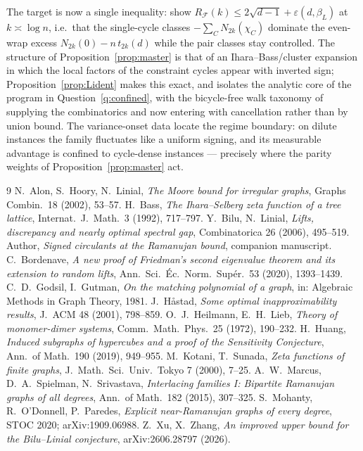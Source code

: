 \documentclass[11pt]{article}
\theoremstyle{remark}
\begin{document}
The target is now a single inequality: show
$R_{\mathcal F}(k)\le2\sqrt{d-1}+\varepsilon(d,\beta_L)$ at
$k\asymp\log n$, i.e.\ that the single-cycle classes
$-\sum_{C}N_{2k}(\chi_C)$ dominate the even-wrap excess
$N_{2k}(0)-n\,t_{2k}(d)$ while the pair classes stay controlled. The
structure of Proposition~\ref{prop:master} is that of an
Ihara--Bass/cluster expansion in which the local factors of the
constraint cycles appear with inverted sign; Proposition~\ref{prop:Lident}
makes this exact, and isolates the analytic core of the program in
Question~\ref{q:confined}, with the bicycle-free walk taxonomy of
\cite{mop20} supplying the combinatorics
and now entering with cancellation rather than by union bound. The variance-onset data locate the regime boundary: on dilute
instances the family fluctuates like a uniform signing, and its
measurable advantage is confined to cycle-dense instances ---
precisely where the parity weights of Proposition~\ref{prop:master}
act.

\begin{thebibliography}{9}
 N.~Alon, S.~Hoory, N.~Linial, \emph{The Moore bound
for irregular graphs}, Graphs Combin.~18 (2002), 53--57.
 H.~Bass, \emph{The Ihara--Selberg zeta function of a
tree lattice}, Internat.~J.~Math.~3 (1992), 717--797.
 Y.~Bilu, N.~Linial,
\emph{Lifts, discrepancy and nearly optimal spectral gap},
Combinatorica 26 (2006), 495--519.
 Author, \emph{Signed circulants at the Ramanujan
bound}, companion manuscript.
 C.~Bordenave, \emph{A new proof of Friedman's
second eigenvalue theorem and its extension to random lifts},
Ann.~Sci.~\'Ec.~Norm.~Sup\'er.~53 (2020), 1393--1439.
 C.~D.~Godsil, I.~Gutman,
\emph{On the matching polynomial of a graph}, in: Algebraic Methods in
Graph Theory, 1981.
 J.~H\aa stad, \emph{Some optimal inapproximability
results}, J.~ACM 48 (2001), 798--859.
 O.~J.~Heilmann, E.~H.~Lieb,
\emph{Theory of monomer-dimer systems}, Comm.~Math.~Phys.~25 (1972),
190--232.
 H.~Huang, \emph{Induced subgraphs of hypercubes and a
proof of the Sensitivity Conjecture}, Ann.~of Math.~190 (2019), 949--955.
 M.~Kotani, T.~Sunada, \emph{Zeta functions of finite
graphs}, J.~Math.~Sci.~Univ.~Tokyo 7 (2000), 7--25.
 A.~W.~Marcus, D.~A.~Spielman, N.~Srivastava,
\emph{Interlacing families I: Bipartite Ramanujan graphs of all degrees},
Ann.~of Math.~182 (2015), 307--325.
 S.~Mohanty, R.~O'Donnell, P.~Paredes,
\emph{Explicit near-Ramanujan graphs of every degree}, STOC 2020;
arXiv:1909.06988.
 Z.~Xu, X.~Zhang, \emph{An improved upper bound for
the Bilu--Linial conjecture}, arXiv:2606.28797 (2026).
\end{thebibliography}
\end{document}
